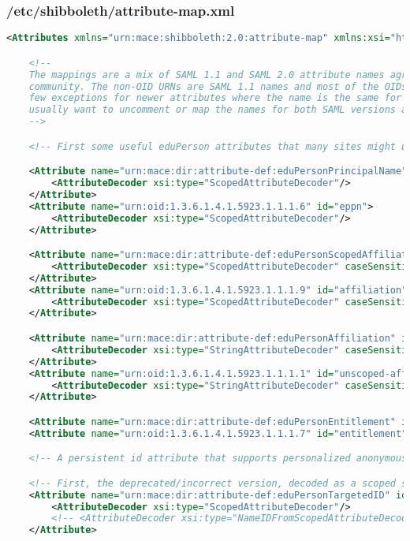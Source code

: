 \subsubsection{/etc/shibboleth/attribute-map.xml}
\begin{lstlisting}[language=xml]
<Attributes xmlns="urn:mace:shibboleth:2.0:attribute-map" xmlns:xsi="http://www.w3.org/2001/XMLSchema-instance">

    <!--
    The mappings are a mix of SAML 1.1 and SAML 2.0 attribute names agreed to within the Shibboleth
    community. The non-OID URNs are SAML 1.1 names and most of the OIDs are SAML 2.0 names, with a
    few exceptions for newer attributes where the name is the same for both versions. You will
    usually want to uncomment or map the names for both SAML versions as a unit.
    -->

    <!-- First some useful eduPerson attributes that many sites might use. -->

    <Attribute name="urn:mace:dir:attribute-def:eduPersonPrincipalName" id="eppn">
        <AttributeDecoder xsi:type="ScopedAttributeDecoder"/>
    </Attribute>
    <Attribute name="urn:oid:1.3.6.1.4.1.5923.1.1.1.6" id="eppn">
        <AttributeDecoder xsi:type="ScopedAttributeDecoder"/>
    </Attribute>

    <Attribute name="urn:mace:dir:attribute-def:eduPersonScopedAffiliation" id="affiliation">
        <AttributeDecoder xsi:type="ScopedAttributeDecoder" caseSensitive="false"/>
    </Attribute>
    <Attribute name="urn:oid:1.3.6.1.4.1.5923.1.1.1.9" id="affiliation">
        <AttributeDecoder xsi:type="ScopedAttributeDecoder" caseSensitive="false"/>
    </Attribute>

    <Attribute name="urn:mace:dir:attribute-def:eduPersonAffiliation" id="unscoped-affiliation">
        <AttributeDecoder xsi:type="StringAttributeDecoder" caseSensitive="false"/>
    </Attribute>
    <Attribute name="urn:oid:1.3.6.1.4.1.5923.1.1.1.1" id="unscoped-affiliation">
        <AttributeDecoder xsi:type="StringAttributeDecoder" caseSensitive="false"/>
    </Attribute>

    <Attribute name="urn:mace:dir:attribute-def:eduPersonEntitlement" id="entitlement"/>
    <Attribute name="urn:oid:1.3.6.1.4.1.5923.1.1.1.7" id="entitlement"/>

    <!-- A persistent id attribute that supports personalized anonymous access. -->

    <!-- First, the deprecated/incorrect version, decoded as a scoped string: -->
    <Attribute name="urn:mace:dir:attribute-def:eduPersonTargetedID" id="targeted-id">
        <AttributeDecoder xsi:type="ScopedAttributeDecoder"/>
        <!-- <AttributeDecoder xsi:type="NameIDFromScopedAttributeDecoder" formatter="$NameQualifier!$SPNameQualifier!$Name" defaultQualifiers="true"/> -->
    </Attribute>


\end{lstlisting}
